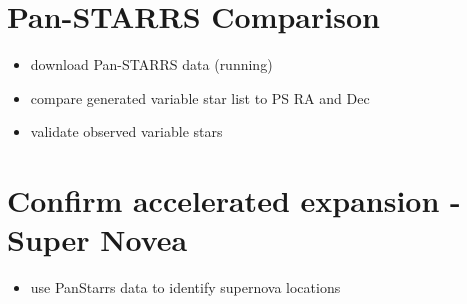 \documentclass[aps,prl,twocolumn,superscriptaddress]{revtex4-1}
\begin{document}
\section{Pan-STARRS Comparison}
\begin{itemize}
	\item{} download Pan-STARRS data (running)
	\item{} compare generated variable star list to PS RA and Dec
	\item{} validate observed variable stars
\end{itemize}



\section{Confirm accelerated expansion - Super Novea}
\begin{itemize}
	\item{} use PanStarrs data to identify supernova locations
\end{itemize}








\setlength{\parindent}{0cm}

\begin{thebibliography}{99}  %


\end{thebibliography}
\end{document}
